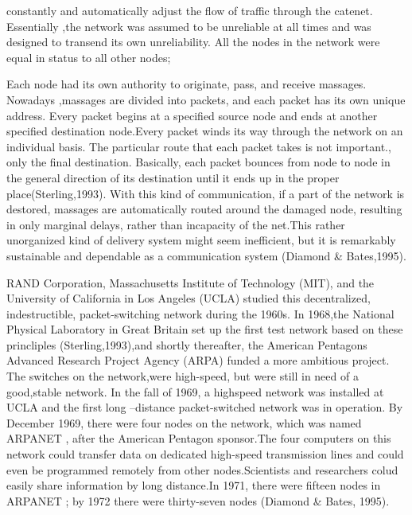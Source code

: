 \documentclass{book} %
\begin{document}


\noindent \begin{flushleft}
constantly and automatically adjust the flow of traffic through the catenet. Essentially ,the network was assumed to be unreliable at all times and was designed to transend its own unreliability. All the nodes in the network were equal in status to all other nodes;

\noindent Each node had its own authority to originate, pass, and receive massages. Nowadays ,massages are divided into packets, and each packet has its own unique address. Every packet begins at a specified source node and ends at another specified destination node.Every packet winds its way through the network on an individual basis. The particular route that each packet takes is not important., only the final destination. Basically, each packet bounces from node to node in the general direction of its destination until it ends up in the proper place(Sterling,1993). With this kind of communication, if a part of the network is destored, massages are automatically routed around the damaged node, resulting in only marginal delays, rather than incapacity of the net.This rather unorganized kind of delivery system might seem inefficient, but it is remarkably sustainable and dependable as a communication system (Diamond \& Bates,1995).

\noindent      RAND Corporation, Massachusetts Institute of Technology (MIT), and the University of California in Los Angeles (UCLA) studied this decentralized, indestructible, packet-switching network during the 1960s. In 1968,the National Physical Laboratory in Great Britain set up the first test network based on these princliples (Sterling,1993),and shortly thereafter, the American Pentagons Advanced Research Project Agency (ARPA) funded a more ambitious project. The switches on the network,were high-speed, but were still in need of a good,stable network. In the fall of 1969, a highspeed network was installed at UCLA and the first long --distance packet-switched network was in operation. By December 1969, there were four nodes on the network, which was named ARPANET , after the American Pentagon sponsor.The four computers on this network could transfer data on dedicated high-speed transmission lines and could even be programmed remotely from other nodes.Scientists and researchers colud easily share information by long distance.In 1971, there were fifteen nodes in ARPANET ; by 1972 there were thirty-seven nodes (Diamond \& Bates, 1995).


\end{flushleft}
\end{document}
